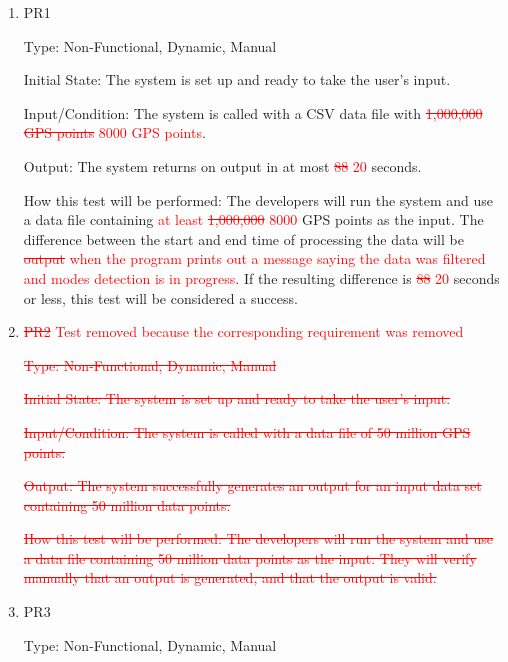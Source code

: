 \documentclass[12pt, titlepage]{article}
\begin{document}
\begin{enumerate}

\item{PR1\\}\label{PR1}

Type: Non-Functional, Dynamic, Manual
					
Initial State: 
The system is set up and ready to take the user's input.

Input/Condition: 
The system is called with a CSV data file with \textcolor{red}{\sout{1,000,000 GPS points} 8000 GPS points}.

Output: 
The system returns on output in at most \textcolor{red}{\sout{88} 20} seconds. 

How this test will be performed:
The developers will run the system and use a data file containing \textcolor{red}{at least \sout{1,000,000} 8000} GPS points as the input. The difference between the start and end time of processing the data will be \textcolor{red}{\sout{output} when the program prints out a message saying the data was filtered and modes detection is in progress}. If the resulting difference is \textcolor{red}{\sout{88} 20} seconds or less, this test will be considered a success.  
\\
\item{\textcolor{red}{\sout{PR2} Test removed because the corresponding requirement was removed}\\}\label{PR2}

\textcolor{red}{\sout{Type: Non-Functional, Dynamic, Manual}}
					
\textcolor{red}{\sout{Initial State: 
The system is set up and ready to take the user's input.}}

\textcolor{red}{\sout{Input/Condition: 
The system is called with a data file of 50 million GPS points.}}

\textcolor{red}{\sout{Output: 
The system successfully generates an output for an input data set containing 50 million data points.}}

\textcolor{red}{\sout{How this test will be performed: The developers will run the system and use a data file containing 50 million data points as the input. They will verify manually that an output is generated, and that the output is valid.}}
\\
\item{PR3\\}\label{PR3}

Type: Non-Functional, Dynamic, Manual
					

\end{enumerate}
\end{document}
